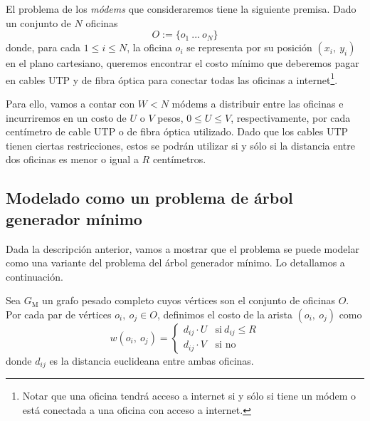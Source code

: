 El problema de los \textit{módems} que consideraremos tiene la siguiente premisa. Dado un conjunto de $N$ oficinas 
\begin{equation*}
    O := \{o_1\ ...\ o_N\}    
\end{equation*}
donde, para cada $1 \leq i \leq N$, la oficina $o_i$ se representa por su posición $(x_i,\ y_i)$ en el plano cartesiano, queremos encontrar el costo mínimo que deberemos pagar en cables UTP y de fibra óptica para conectar todas las oficinas a internet\footnote{Notar que una oficina tendrá acceso a internet si y sólo si tiene un módem o está conectada a una oficina con acceso a internet.}.

Para ello, vamos a contar con $W < N$ módems a distribuir entre las oficinas e incurriremos en un costo de $U$ o $V$ pesos, $0 \leq U \leq V$, respectivamente, por cada centímetro de cable UTP o de fibra óptica utilizado. Dado que los cables UTP tienen ciertas restricciones, estos se podrán utilizar si y sólo si la distancia entre dos oficinas es menor o igual a $R$ centímetros. 


\subsection{Modelado como un problema de árbol generador mínimo}\label{modelo}

Dada la descripción anterior, vamos a mostrar que el problema se puede modelar como una variante del problema del árbol generador mínimo. Lo detallamos a continuación.

Sea $G_{\text{M}}$ un grafo pesado completo cuyos vértices son el conjunto de oficinas $O$. Por cada par de vértices $o_i,\ o_j \in O$, definimos el costo de la arista $(o_i,\ o_j)$ como
\begin{equation*}
    w(o_i,\ o_j) = \begin{cases}
        d_{ij} \cdot U &\text{si}\ d_{ij} \leq R \\
        d_{ij} \cdot V & \text{si no}
    \end{cases}
\end{equation*}
donde $d_{ij}$ es la distancia euclideana entre ambas oficinas. 

